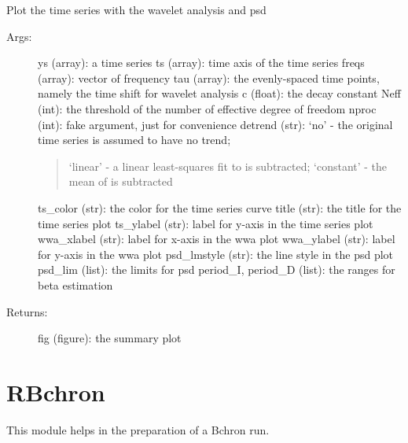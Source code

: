 \documentclass[letterpaper,10pt,english]{sphinxmanual}
\begin{document}

\begin{fulllineitems}
\label{\detokenize{Spectral:pyleoclim.Spectral.plot_summary}}
Plot the time series with the wavelet analysis and psd
\begin{description}
\item[{Args:}] \leavevmode
ys (array): a time series
ts (array): time axis of the time series
freqs (array): vector of frequency
tau (array): the evenly-spaced time points, namely the time shift for wavelet analysis
c (float): the decay constant
Neff (int): the threshold of the number of effective degree of freedom
nproc (int): fake argument, just for convenience
detrend (str): ‘no’ - the original time series is assumed to have no trend;
\begin{quote}

‘linear’ - a linear least-squares fit to  is subtracted;
‘constant’ - the mean of  is subtracted
\end{quote}

ts\_color (str): the color for the time series curve
title (str): the title for the time series plot
ts\_ylabel (str): label for y-axis in the time series plot
wwa\_xlabel (str): label for x-axis in the wwa plot
wwa\_ylabel (str): label for y-axis in the wwa plot
psd\_lmstyle (str): the line style in the psd plot
psd\_lim (list): the limits for psd
period\_I, period\_D (list): the ranges for beta estimation

\item[{Returns:}] \leavevmode
fig (figure): the summary plot

\end{description}

\end{fulllineitems}



\chapter{RBchron}
\label{\detokenize{RBchron::doc}}\label{\detokenize{RBchron:rbchron}}
This module helps in the preparation of a Bchron run.
\end{document}
